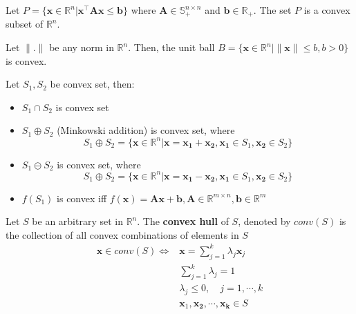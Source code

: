 				\begin{example}
					Let $P = \{\mathbf{x}\in \mathbb{R}^n | \mathbf{x}^\top \mathbf{Ax} \le \mathbf{b}\}$ where $\mathbf{A} \in \mathbb{S}_+^{n\times n}$ and $\mathbf{b} \in \mathbb{R}_+$. The set $P$ is a convex subset of $\mathbb{R}^n$.
				\end{example}

				\begin{example}
					Let $\|.\|$ be any norm in $\mathbb{R}^n$. Then, the unit ball $B = \{\mathbf{x} \in \mathbb{R}^n | \|\mathbf{x}\| \le b, b > 0\}$ is convex.
				\end{example}

				Let	$S_1, S_2$ be convex set, then:
				\begin{itemize}
					\item $S_1 \cap S_2$ is convex set
					\item $S_1 \oplus S_2$ (Minkowski addition) is convex set, where
						\begin{equation}
							S_1 \oplus S_2 = \{\mathbf{x} \in \mathbb{R}^n| \mathbf{x} = \mathbf{x_1} + \mathbf{x_2}, \mathbf{x_1} \in S_1, \mathbf{x_2} \in S_2\}
						\end{equation}
					\item $S_1 \ominus S_2$ is convex set, where
						\begin{equation}
							S_1 \oplus S_2 = \{\mathbf{x} \in \mathbb{R}^n| \mathbf{x} = \mathbf{x_1} - \mathbf{x_2}, \mathbf{x_1} \in S_1, \mathbf{x_2} \in S_2\}
						\end{equation}
					\item $f(S_1)$ is convex iff $f(\mathbf{x}) = \mathbf{Ax} + \mathbf{b}, \mathbf{A} \in \mathbb{R}^{m\times n}, \mathbf{b} \in \mathbb{R}^m$
				\end{itemize}

				\begin{definition}
					Let $S$ be an arbitrary set in $\mathbb{R}^n$. The \textbf{convex hull} of $S$, denoted by $conv(S)$ is the collection of all convex combinations of elements in $S$\
					\begin{align}
						\mathbf{x} \in conv(S) \iff & \mathbf{x} = \sum_{j = 1}^k \lambda_j \mathbf{x}_j \\
						& \sum_{j = 1}^k \lambda_j = 1\\
						& \lambda_j \le 0, \quad j = 1, \cdots, k \\
						& \mathbf{x}_1, \mathbf{x_2}, \cdots, \mathbf{x_k} \in S
					\end{align}
					
				\end{definition}

